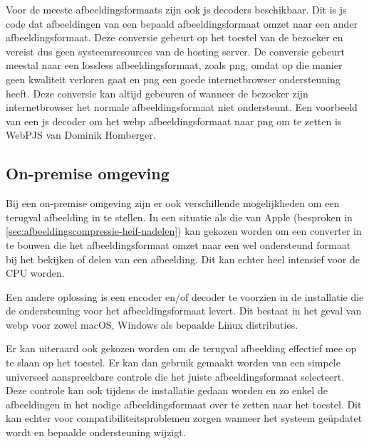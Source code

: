 Voor de meeste \glspl{afbeeldingsformaat} zijn ook \gls{js} \glspl{decoder} beschikbaar. Dit is \gls{js} code dat afbeeldingen van een bepaald \gls{afbeeldingsformaat} omzet naar een ander \gls{afbeeldingsformaat}. Deze conversie gebeurt op het toestel van de bezoeker en vereist dus geen systeemresources van de \gls{hosting} server. De conversie gebeurt meestal naar een \gls{lossless} \gls{afbeeldingsformaat}, zoals \gls{png}, omdat op die manier geen kwaliteit verloren gaat en \gls{png} een goede internetbrowser ondersteuning heeft. Deze conversie kan altijd gebeuren of wanneer de bezoeker zijn internetbrowser het normale \gls{afbeeldingsformaat} niet ondersteunt. Een voorbeeld van een \gls{js} \gls{decoder} om het \gls{webp} \gls{afbeeldingsformaat} naar \gls{png} om te zetten is WebPJS van Dominik Homberger.

\subsection{On-premise omgeving}
\label{sec:afbeeldingscompressie-implementatie-on-premise}

Bij een \gls{on-premise} omgeving zijn er ook verschillende mogelijkheden om een terugval afbeelding in te stellen. In een situatie als die van Apple (besproken in \ref{sec:afbeeldingscompressie-heif-nadelen}) kan gekozen worden om een converter in te bouwen die het \gls{afbeeldingsformaat} omzet naar een wel ondersteund formaat bij het bekijken of delen van een afbeelding. Dit kan echter heel intensief voor de CPU worden.

Een andere oplossing is een encoder en/of decoder te voorzien in de installatie die de ondersteuning voor het \gls{afbeeldingsformaat} levert. Dit bestaat in het geval van \gls{webp} voor zowel macOS, Windows als bepaalde Linux distributies.

Er kan uiteraard ook gekozen worden om de terugval afbeelding effectief mee op te slaan op het toestel. Er kan dan gebruik gemaakt worden van een simpele universeel aanspreekbare controle die het juiste afbeeldingsformaat selecteert. Deze controle kan ook tijdens de installatie gedaan worden en zo enkel de afbeeldingen in het nodige \gls{afbeeldingsformaat} over te zetten naar het toestel. Dit kan echter voor compatibiliteitsproblemen zorgen wanneer het systeem geüpdatet wordt en bepaalde ondersteuning wijzigt.